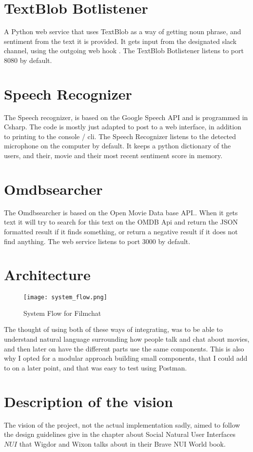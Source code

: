 \documentclass[11pt,fleqn]{book} %
\begin{document}
\section{TextBlob Botlistener}
A Python web service that uses TextBlob\cite{TextBlobTutorial:Documentation} as a way of getting noun phrase, and sentiment from the text it is provided. It gets input from the designated slack channel, using the outgoing web hook \cite{SlackOutgoingSlack}. The TextBlob Botlistener listens to port 8080 by default.

\section{Speech Recognizer}
The Speech recognizer, is based on the Google Speech API \cite{GoogleCloudPlatformSpeechPlatform} and is programmed in Csharp. The code is mostly just adapted to post to a web interface, in addition to printing to the console / cli. The Speech Recognizer listens to the detected microphone on the computer by default. It keeps a python dictionary of the users, and their, movie and their most recent sentiment score in memory.

\section{Omdbsearcher}
The Omdbsearcher is based on the Open Movie Data base API.\cite{OMDbDatabase}. When it gets text it will try to search for this text on the OMDB Api and return the JSON formatted result if it finds something, or return a negative result if it does not find anything. The web service listens to port 3000 by default.

\newpage
\section{Architecture}
\begin{figure}[]
  \centering
   \texttt{[image: system\_flow.png]}
  \caption{System Flow for Filmchat}
  \label{fig:system_flow}
\end{figure}
The thought of using both of these ways of integrating, was to be able to understand natural language surrounding how people talk and chat about movies, and then later on have the different parts use the same components. This is also why I opted for a modular approach building small components, that I could add to on a later point, and that was easy to test using Postman.

\section{Description of the vision}
The vision of the project, not the actual implementation sadly, aimed to follow the design guidelines give in the chapter about Social Natural User Interfaces \(NUI\) that Wigdor and Wixon talks about in their Brave NUI World book. \cite{WigdorBraveWorld}
\end{document}
